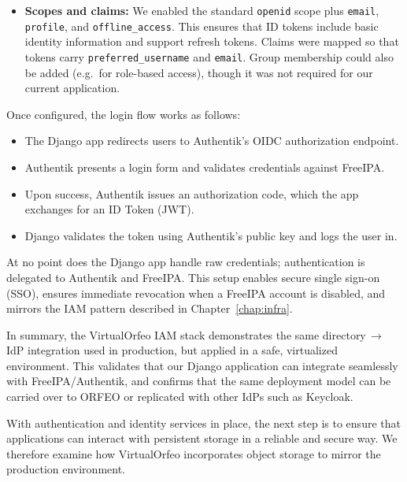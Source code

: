 \begin{itemize}
	\item \textbf{Scopes and claims:}  
	We enabled the standard \texttt{openid} scope plus \texttt{email}, 
	\texttt{profile}, and \texttt{offline\_access}. This ensures that ID tokens 
	include basic identity information and support refresh tokens. Claims were 
	mapped so that tokens carry \texttt{preferred\_username} and \texttt{email}. 
	Group membership could also be added (e.g.\ for role-based access), though it 
	was not required for our current application.  
\end{itemize}

\medskip

Once configured, the login flow works as follows:  
\begin{itemize}
	\item The Django app redirects users to Authentik’s OIDC authorization 
	endpoint.  
	\item Authentik presents a login form and validates credentials against 
	FreeIPA.  
	\item Upon success, Authentik issues an authorization code, which the app 
	exchanges for an ID Token (JWT).  
	\item Django validates the token using Authentik’s public key and logs the 
	user in.  
\end{itemize}

At no point does the Django app handle raw credentials; authentication is 
delegated to Authentik and FreeIPA. This setup enables secure single sign-on 
(SSO), ensures immediate revocation when a FreeIPA account is disabled, and 
mirrors the IAM pattern described in Chapter~\ref{chap:infra}.

\medskip

In summary, the VirtualOrfeo IAM stack demonstrates the same 
directory\,$\rightarrow$\,IdP integration used in production, but applied in a 
safe, virtualized environment. This validates that our Django application can 
integrate seamlessly with FreeIPA/Authentik, and confirms that the same 
deployment model can be carried over to ORFEO or replicated with other IdPs such 
as Keycloak.

\medskip
\noindent With authentication and identity services in place, the next step is 
to ensure that applications can interact with persistent storage in a reliable 
and secure way. We therefore examine how VirtualOrfeo incorporates object 
storage to mirror the production environment.



